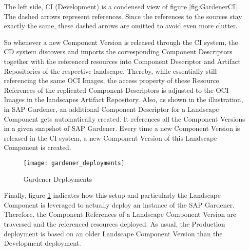 The left side, CI (Development) is a condensed view of figure \ref{fig:GardenerCI}. The dashed arrows represent references. Since the references to the sources stay exactly the same, these dashed arrows are omitted to avoid even more clutter.\par 
So whenever a new Component Version is released through the CI system, the CD system discovers and imports the corresponding Component Descriptors together with the referenced resources into Component Descriptor and Artifact Repositories of the respective landscape. Thereby, while essentially still referencing the same OCI Images, the access property of these Resource References of the replicated Component Descriptors is adjusted to the OCI Images in the landscapes Artifact Repository. Also, as shown in the illustration, in SAP Gardener, an additional Component Descriptor for a Landscape Component gets automatically created. It references all the Component Versions in a given snapshot of SAP Gardener. Every time a new Component Version is released in the CI system, a new Component Version of this Landscape Component is created.\par 

\begin{figure}[H]
	\centering
	\texttt{[image: gardener\_deployments]}
	\caption[Gardener Deployments]{Gardener Deployments }
	\label{fig:GardenerDeployments}
\end{figure}

Finally, figure \ref{fig:GardenerDeployments} indicates how this setup and particularly the Landscape Component is leveraged to actually deploy an instance of the SAP Gardener. Therefore, the Component References of a Landscape Component Version are traversed and the referenced resources deployed. As usual, the Production deployment is based on an older Landscape Component Version than the Development deployment. 


